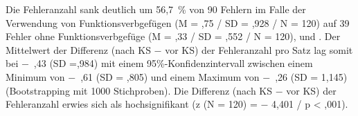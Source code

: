 Die Fehleranzahl sank deutlich um 56,7~\% von 90 Fehlern im Falle der Verwendung von Funktionsverbgefügen (M = ,75 / SD = ,928 / N = 120) auf 39 Fehler ohne Funktionsverbgefüge (M = ,33 / SD = ,552 / N = 120),  und . Der Mittelwert der Differenz (nach KS $-$ vor KS) der Fehleranzahl pro Satz lag somit bei $-$~,43 (SD =,984) mit einem 95\%\nobreakdash-Konfidenzintervall zwischen einem Minimum von $-$~,61 (SD = ,805) und einem Maximum von $-$~,26 (SD = 1,145) (Bootstrapping mit 1000 Stichproben). Die Differenz (nach KS $-$ vor KS) der Fehleranzahl erwies sich als hochsignifikant (z (N = 120) = $-$ 4,401 / p < ,001).

\begin{figure}\captionsetup{width=.45\textwidth}
\begin{floatrow}
\end{floatrow}

\end{figure}

